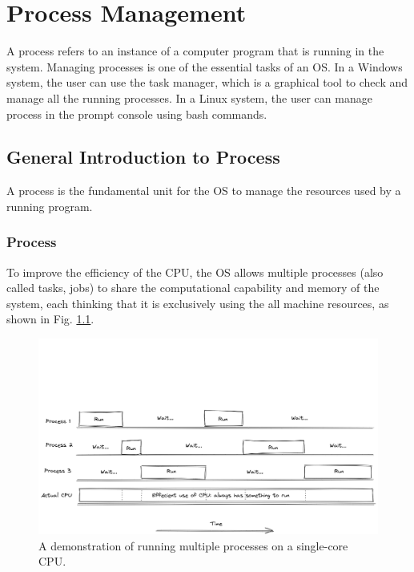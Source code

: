 \chapter{Process Management} \label{ch:pm}

A process refers to an instance of a computer program that is running in the system. Managing processes is one of the essential tasks of an OS. In a Windows system, the user can use the task manager, which is a graphical tool to check and manage all the running processes. In a Linux system, the user can manage process in the prompt console using bash commands.

\section{General Introduction to Process}

A process is the fundamental unit for the OS to manage the resources used by a running program.

\subsection{Process}

To improve the efficiency of the CPU, the OS allows multiple processes (also called tasks, jobs) to share the computational capability and memory of the system, each thinking that it is exclusively using the all machine resources, as shown in Fig. \ref{ch:pm:fig:processflow}.

\begin{figure}[htbp]
	\centering
	\includegraphics[width=350pt]{chapters/part-1/figures/processflow.png}
	\caption{A demonstration of running multiple processes on a single-core CPU.} \label{ch:pm:fig:processflow}
\end{figure}

